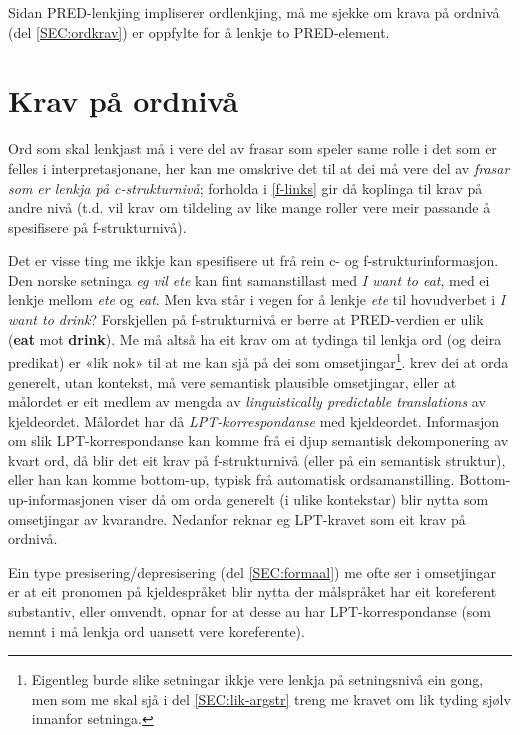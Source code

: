 \documentclass[11pt,a4paper,oneside,draft]{book}
\begin{document}
Sidan PRED-lenkjing impliserer ordlenkjing, må me sjekke om krava på
ordnivå (del \ref{SEC:ordkrav}) er oppfylte for å lenkje to
PRED-element. 

\section{Krav på ordnivå}
\label{sec-3.5}

\label{SEC:ordkrav}

Ord som skal lenkjast må i \cite{thunes2003eal} vere del av frasar som
speler same rolle i det som er felles i interpretasjonane, her kan me
omskrive det til at dei må vere del av \emph{frasar som er lenkja på c-strukturnivå}; forholda i \ref{f-links} gir då koplinga til krav på
andre nivå (t.d. vil krav om tildeling av like mange roller vere
meir passande å spesifisere på f-strukturnivå).

Det er visse ting me ikkje kan spesifisere ut frå rein c- og
f-strukturinformasjon. Den norske setninga \emph{eg vil ete} kan fint
samanstillast med \emph{I want to eat}, med ei lenkje mellom \emph{ete} og
\emph{eat}. Men kva står i vegen for å lenkje \emph{ete} til hovudverbet i \emph{I want to drink}? Forskjellen på f-strukturnivå er berre at PRED-verdien
er ulik (\textbf{eat} mot \textbf{drink}). Me må altså ha eit krav om at tydinga til
lenkja ord (og deira predikat) er «lik nok» til at me kan sjå på dei
som omsetjingar\footnote{Eigentleg burde slike setningar ikkje vere lenkja på
        setningsnivå ein gong, men som me skal sjå i del
        \ref{SEC:lik-argstr} treng me kravet om lik tyding 
        sjølv innanfor setninga. }. \citet[s.~74]{dyvik2009lmp} krev dei at orda
generelt, utan kontekst, må vere semantisk plausible omsetjingar,
eller at målordet er eit medlem av mengda av \emph{linguistically predictable translations} av kjeldeordet. Målordet har då
\emph{LPT-korrespondanse} med kjeldeordet. Informasjon om slik
LPT-korrespondanse kan komme frå ei djup semantisk dekomponering av
kvart ord, då blir det eit krav på f-strukturnivå (eller på ein
semantisk struktur), eller han kan komme bottom-up, typisk frå
automatisk ordsamanstilling. Bottom-up-informasjonen viser då om orda
generelt (i ulike kontekstar) blir nytta som omsetjingar av kvarandre.
Nedanfor reknar eg LPT-kravet som eit krav på ordnivå.

 
Ein type presisering/depresisering (del \ref{SEC:formaal}) me ofte ser
i omsetjingar er at eit pronomen på kjeldespråket blir nytta der
målspråket har eit koreferent substantiv, eller
omvendt. \citet{dyvik2009lmp} opnar for at desse au har
LPT-korrespondanse (som nemnt i \cite{thunes2003eal} må lenkja ord
uansett vere koreferente).
\end{document}
